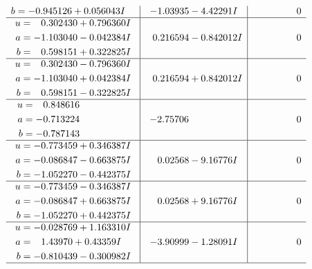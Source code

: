 \documentclass[1p]{elsarticle_modified}
\theoremstyle{definition}
\begin{document}
$$\begin{array}{c|c|c}
\begin{aligned}
b &= -0.945126 + 0.056043 I\end{aligned}
 & -1.03935 - 4.42291 I & \phantom{-0.000000 } 0 \\ \hline\begin{aligned}
u &= \phantom{-}0.302430 + 0.796360 I \\
a &= -1.103040 - 0.042384 I \\
b &= \phantom{-}0.598151 + 0.322825 I\end{aligned}
 & \phantom{-}0.216594 - 0.842012 I & \phantom{-0.000000 } 0 \\ \hline\begin{aligned}
u &= \phantom{-}0.302430 - 0.796360 I \\
a &= -1.103040 + 0.042384 I \\
b &= \phantom{-}0.598151 - 0.322825 I\end{aligned}
 & \phantom{-}0.216594 + 0.842012 I & \phantom{-0.000000 } 0 \\ \hline\begin{aligned}
u &= \phantom{-}0.848616\phantom{ +0.000000I} \\
a &= -0.713224\phantom{ +0.000000I} \\
b &= -0.787143\phantom{ +0.000000I}\end{aligned}
 & -2.75706\phantom{ +0.000000I} & \phantom{-0.000000 } 0 \\ \hline\begin{aligned}
u &= -0.773459 + 0.346387 I \\
a &= -0.086847 - 0.663875 I \\
b &= -1.052270 - 0.442375 I\end{aligned}
 & \phantom{-}0.02568 - 9.16776 I & \phantom{-0.000000 } 0 \\ \hline\begin{aligned}
u &= -0.773459 - 0.346387 I \\
a &= -0.086847 + 0.663875 I \\
b &= -1.052270 + 0.442375 I\end{aligned}
 & \phantom{-}0.02568 + 9.16776 I & \phantom{-0.000000 } 0 \\ \hline\begin{aligned}
u &= -0.028769 + 1.163310 I \\
a &= \phantom{-}1.43970 + 0.43359 I \\
b &= -0.810439 - 0.300982 I\end{aligned}
 & -3.90999 - 1.28091 I & \phantom{-0.000000 } 0\\
 \hline 
 \end{array}$$\newpage$$\begin{array}{c|c|c}  

\end{array}$$
\end{document}
